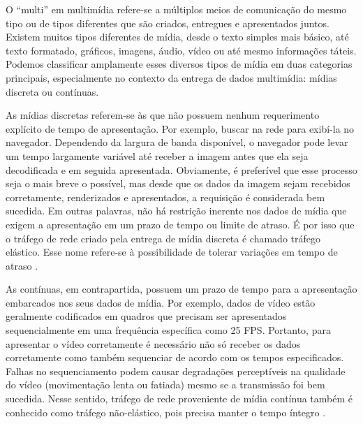 \documentclass[12pt, %
openright, 
oneside, %
a4paper,    %
brazil]{facom-ufu-abntex2}
\begin{document}
O ``multi'' em multimídia refere-se a múltiplos meios de comunicação do mesmo
tipo ou de tipos diferentes que são criados, entregues e apresentados juntos.
Existem muitos tipos diferentes de mídia, desde o texto simples mais básico,
até texto formatado, gráficos, imagens, áudio, vídeo ou até mesmo informações
táteis. Podemos classificar amplamente esses diversos tipos de mídia em duas
categorias principais, especialmente no contexto da entrega de dados
multimídia: mídias discreta ou contínuas.

As mídias discretas referem-se às que não possuem nenhum requerimento explícito
de tempo de apresentação. Por exemplo, buscar na rede para exibí-la no
navegador. Dependendo da largura de banda disponível, o navegador pode levar um
tempo largamente variável até receber a imagem antes que ela seja decodificada
e em seguida apresentada. Obviamente, é preferível que esse processo seja o
mais breve o possível, mas desde que os dados da imagem sejam recebidos
corretamente, renderizados e apresentados, a requisição é considerada bem
sucedida. Em outras palavras, não há restrição inerente nos dados de mídia que
exigem a apresentação em um prazo de tempo ou limite de atraso. É por isso que
o tráfego de rede criado pela entrega de mídia discreta é chamado tráfego
elástico. Esse nome refere-se à possibilidade de tolerar variações em tempo de
atraso \cite{lee2005scalable}.

As contínuas, em contrapartida, possuem um prazo de tempo para a apresentação
embarcados nos seus dados de mídia. Por exemplo, dados de vídeo estão
geralmente codificados em quadros que precisam ser apresentados sequencialmente
em uma frequência específica como 25 FPS. Portanto, para apresentar o vídeo
corretamente é necessário não só receber os dados corretamente como também
sequenciar de acordo com os tempos especificados. Falhas no sequenciamento
podem causar degradações perceptíveis na qualidade do vídeo (movimentação lenta
ou fatiada) mesmo se a transmissão foi bem sucedida. Nesse sentido, tráfego de
rede proveniente de mídia contínua também é conhecido como tráfego
não-elástico, pois precisa manter o tempo íntegro \cite{lee2005scalable}.


\end{document}
